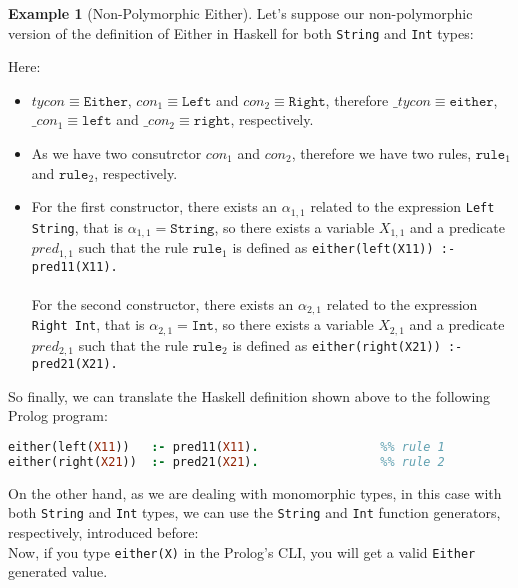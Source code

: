 \documentclass{report}
\theoremstyle{definition}
\newtheorem{example}{Example}[section]
\theoremstyle{definition}
\newcommand{\ttt}[1]{\texttt{#1}}
\begin{document}
\begin{example}[Non-Polymorphic Either]
	Let's suppose our non-polymorphic version of the definition of Either in Haskell for both \ttt{String} and \ttt{Int} types:
	
	Here:
	\begin{itemize}
		\item $tycon \equiv \ttt{Either}$, $con_1 \equiv \ttt{Left}$ and $con_2 \equiv \ttt{Right}$, therefore $\_tycon \equiv \ttt{either}$, $\_con_1 \equiv \ttt{left}$ and $\_con_2 \equiv \ttt{right}$, respectively.
		\item As we have two consutrctor $con_1$ and $con_2$, therefore we have two rules, $\ttt{rule}_1$ and $\ttt{rule}_2$, respectively.
		\item For the first constructor, there exists an $\alpha_{1,1}$ related to the expression \ttt{Left String}, that is $\alpha_{1,1} = \ttt{String}$, so there exists a variable $X_{1,1}$ and a predicate $pred_{1,1}$ such that the rule $\ttt{rule}_1$ is defined as \ttt{either(left(X11)) :- pred11(X11).}\\\\
		      For the second constructor, there exists an $\alpha_{2,1}$ related to the expression \ttt{Right Int}, that is $\alpha_{2,1} = \ttt{Int}$, so there exists a variable $X_{2,1}$ and a predicate $pred_{2,1}$ such that the rule $\ttt{rule}_2$ is defined as \ttt{either(right(X21)) :- pred21(X21).}
	\end{itemize}
	So finally, we can translate the Haskell definition shown above to the following Prolog program:\\
	\begin{lstlisting}[language=Prolog]
either(left(X11)) 	:- pred11(X11).					%% rule 1
either(right(X21)) 	:- pred21(X21).					%% rule 2
	\end{lstlisting}
	On the other hand, as we are dealing with monomorphic types, in this case with both \ttt{String} and \ttt{Int} types, we can use the \ttt{String} and \ttt{Int} function generators, respectively, introduced before:\\
	
	Now, if you type \ttt{either(X)} in the Prolog's CLI, you will get a valid \ttt{Either} generated value.\\
\end{example}
\end{document}
